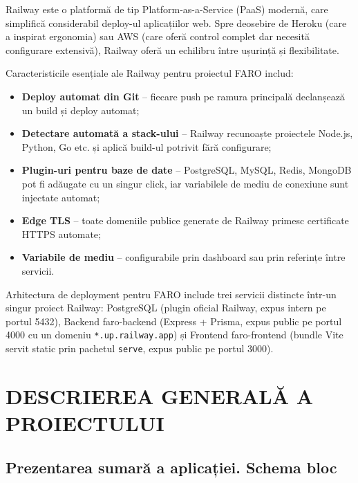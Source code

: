 \documentclass[12pt,a4paper,oneside]{report}
\begin{document}
Railway este o platformă de tip Platform-as-a-Service (PaaS) modernă, care simplifică considerabil deploy-ul aplicațiilor web. Spre deosebire de Heroku (care a inspirat ergonomia) sau AWS (care oferă control complet dar necesită configurare extensivă), Railway oferă un echilibru între ușurință și flexibilitate. \cite{ref:railway}

Caracteristicile esențiale ale Railway pentru proiectul FARO includ:

\begin{itemize}[leftmargin=2cm,itemsep=2pt]
  \item \textbf{Deploy automat din Git} -- fiecare push pe ramura principală declanșează un build și deploy automat;
  \item \textbf{Detectare automată a stack-ului} -- Railway recunoaște proiectele Node.js, Python, Go etc. și aplică build-ul potrivit fără configurare;
  \item \textbf{Plugin-uri pentru baze de date} -- PostgreSQL, MySQL, Redis, MongoDB pot fi adăugate cu un singur click, iar variabilele de mediu de conexiune sunt injectate automat;
  \item \textbf{Edge TLS} -- toate domeniile publice generate de Railway primesc certificate HTTPS automate;
  \item \textbf{Variabile de mediu} -- configurabile prin dashboard sau prin referințe între servicii.
\end{itemize}

Arhitectura de deployment pentru FARO include trei servicii distincte într-un singur proiect Railway: PostgreSQL (plugin oficial Railway, expus intern pe portul 5432), Backend faro-backend (Express + Prisma, expus public pe portul 4000 cu un domeniu \texttt{*.up.railway.app}) și Frontend faro-frontend (bundle Vite servit static prin pachetul \texttt{serve}, expus public pe portul 3000).

\chapter{DESCRIEREA GENERALĂ A PROIECTULUI}

\section{Prezentarea sumară a aplicației. Schema bloc}
\end{document}
